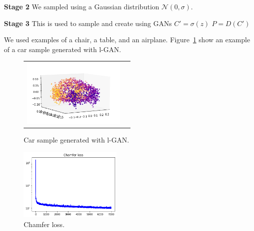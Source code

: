 \documentclass[12pt]{article}
\begin{document}
    \textbf{Stage 2}
    We sampled using a Gaussian distribution $\mathcal{N}(0,\sigma)$.


    \textbf{Stage 3}
    This is used to sample and create using GANs
    $C' = \sigma(z)$
    $P = D(C')$

    We used examples of a chair, a table, and an airplane.
    Figure~\ref{figure:car_sampled_with_lGAN} show an example of a car sample generated with l-GAN.

    \begin{figure}
        \centering
        \begin{tabular}{cc}
            \includegraphics[width = 50mm]{car-lgan}
        \end{tabular}
        \caption{Car sample generated with l-GAN.}
        \label{figure:car_sampled_with_lGAN}
    \end{figure}


    \begin{figure}
        \centering
        \includegraphics[width = 50mm]{chamfer-loss}
        \caption{Chamfer loss.}
        \label{figure:chamfer_loss}
    \end{figure}
\end{document}
